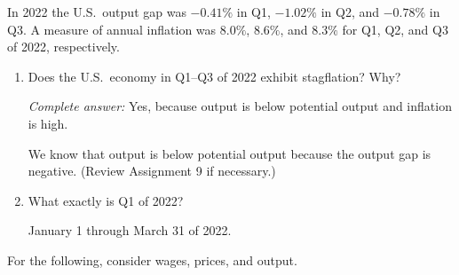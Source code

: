 \documentclass{assignment}
\begin{document}
In 2022 the U.S.~output gap was $-0.41\%$ in Q1, $-1.02\%$ in Q2, and $-0.78\%$ in Q3. A measure of annual inflation was $8.0\%$, $8.6\%$, and $8.3\%$ for Q1, Q2, and Q3 of 2022, respectively.

\begin{enumerate}[resume]

\item Does the U.S.~economy in Q1--Q3 of 2022 exhibit stagflation? Why?

\begin{solution}
\emph{Complete answer:} Yes, because output is below potential output and inflation is high.

We know that output is below potential output because the output gap is negative. (Review Assignment 9 if necessary.)
\end{solution}

\item What exactly is Q1 of 2022?

\begin{solution}
January 1 through March 31 of 2022.
\end{solution}

\end{enumerate}

For the following, consider wages, prices, and output.
\end{document}
